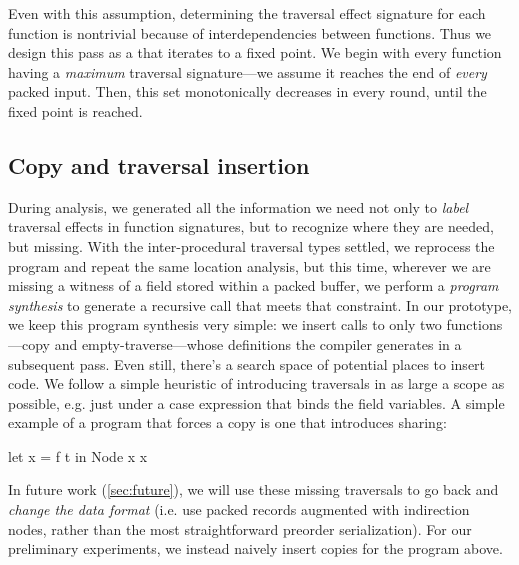 \documentclass[a4paper,english]{lipics-v2016}
\begin{document}
Even with this assumption, determining the traversal effect signature for each
function is nontrivial because of interdependencies between functions.
Thus we design this pass as a  that iterates
to a fixed point.
%
We begin with every function having a {\em maximum} traversal signature---we
assume it reaches the end of {\em every} packed input. Then, this set
monotonically decreases in every round, until the fixed point is reached.

\subsection{Copy and traversal insertion}\label{sec:copy-insert}

{During analysis, we generated all the information we need not only to {\em
    label} traversal effects in function signatures, but to recognize where they are needed, but
  missing.}
\Red
{With the inter-procedural traversal types settled, we reprocess
  the program and repeat the same location analysis, but this time, wherever we
  are missing a witness of a field stored within a packed buffer, we perform a
  {\em program synthesis} to generate a recursive call that meets that constraint.
In our prototype, we keep this program synthesis very simple: we insert calls to
only two functions---copy and empty-traverse---whose definitions the compiler
generates in a subsequent pass.  {Even still, there's a search space of
  potential places to insert code.  We follow a simple heuristic of introducing
  traversals in as large a scope as possible, e.g. just under a case expression
  that binds the field variables.}}
A simple example of a program that forces a copy is one that introduces sharing:
%
\begin{code}
let x = f t in  Node x x 
\end{code}

In future work (\cref{sec:future}), we will use these missing traversals to go
back and {\em change the data format} (i.e. use packed records {augmented} with
indirection nodes, rather than the most straightforward preorder serialization).
%
For our preliminary experiments, we instead naively insert copies for the
program above.


\end{document}
